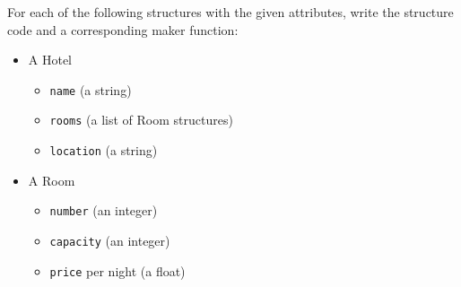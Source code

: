 For each of the following structures with the given attributes,
write the structure code and a corresponding maker function:\\
\begin{itemize}
	\item A Hotel
	\begin{itemize}
		\item \texttt{name} (a string)
		\item \texttt{rooms} (a list of Room structures)
		\item \texttt{location} (a string)
	\end{itemize}
	\item A Room
	\begin{itemize}
		\item \texttt{number} (an integer)
		\item \texttt{capacity} (an integer)
		\item \texttt{price} per night (a float)
	\end{itemize}
\end{itemize}

\small
\begin{answer}
	
\end{answer}
\normalsize

\vspace{48pt}
